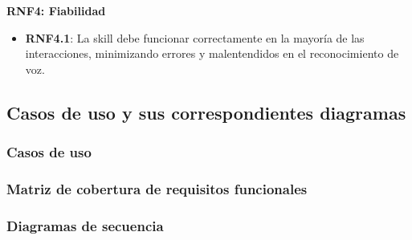 \textbf{RNF4: Fiabilidad}
\begin{itemize}
    \item \textbf{RNF4.1}: La skill debe funcionar correctamente en la mayoría de las interacciones, minimizando errores y malentendidos en el reconocimiento de voz.
\end{itemize}

\newpage
\subsection{Casos de uso y sus correspondientes diagramas}
\subsubsection{Casos de uso}
\subsubsection{Matriz de cobertura de requisitos funcionales}
\subsubsection{Diagramas de secuencia}



